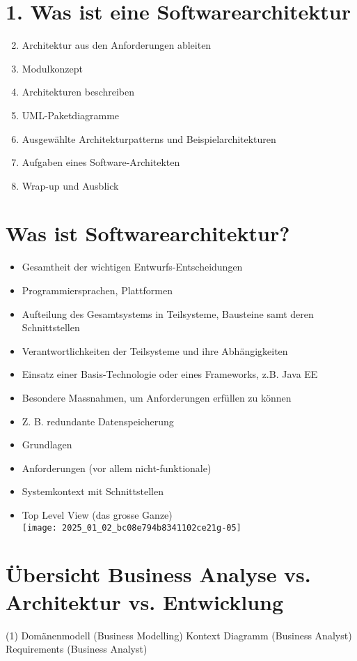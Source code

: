 \documentclass[10pt]{article}
\begin{document}
\section*{1. Was ist eine Softwarearchitektur}
\begin{enumerate}
  \setcounter{enumi}{1}
  \item Architektur aus den Anforderungen ableiten
  \item Modulkonzept
  \item Architekturen beschreiben
  \item UML-Paketdiagramme
  \item Ausgewählte Architekturpatterns und Beispielarchitekturen
  \item Aufgaben eines Software-Architekten
  \item Wrap-up und Ausblick
\end{enumerate}

\section*{Was ist Softwarearchitektur?}
\begin{itemize}
  \item Gesamtheit der wichtigen Entwurfs-Entscheidungen
  \item Programmiersprachen, Plattformen
  \item Aufteilung des Gesamtsystems in Teilsysteme, Bausteine samt deren Schnittstellen
  \item Verantwortlichkeiten der Teilsysteme und ihre Abhängigkeiten
  \item Einsatz einer Basis-Technologie oder eines Frameworks, z.B. Java EE
  \item Besondere Massnahmen, um Anforderungen erfüllen zu können
  \item Z. B. redundante Datenspeicherung
  \item Grundlagen
  \item Anforderungen (vor allem nicht-funktionale)
  \item Systemkontext mit Schnittstellen
  \item Top Level View (das grosse Ganze)\\
\texttt{[image: 2025\_01\_02\_bc08e794b8341102ce21g-05]}
\end{itemize}

\section*{Übersicht Business Analyse vs. Architektur vs. Entwicklung}
(1) Domänenmodell (Business Modelling) Kontext Diagramm (Business Analyst)\\
Requirements (Business Analyst)
\end{document}
